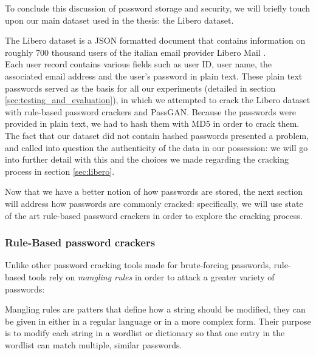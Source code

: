 To conclude this discussion of password storage and security, we will briefly touch upon our main dataset used in the thesis: the Libero dataset.

The Libero dataset is a JSON formatted document that contains information on roughly 700 thousand users of the italian email provider Libero Mail \cite{libero_leak}.\\
Each user record contains various fields such as  user ID, user name, the associated email address and the user's password in plain text.
These plain text passwords served as the basis for all our experiments (detailed in section \ref{sec:testing_and_evaluation}), in which we attempted to crack the Libero dataset with rule-based password crackers and PassGAN. Because the passwords were provided in plain text, we had to hash them with MD5 in order to crack them.
The fact that our dataset did not contain hashed passwords presented a problem, and called into question the authenticity of the data in our possession: we will go into further detail with this  and the choices we made regarding the cracking process in section \ref{sec:libero}.  

Now that we have a better notion of how passwords are stored, the next section will address how passwords are commonly cracked: specifically, we will use state of the art rule-based password crackers in order to explore the cracking process. %


\subsubsection{Rule-Based password crackers} \label{hash_and_jtr}
Unlike other password cracking tools made for brute-forcing passwords, rule-based tools rely on \emph{mangling rules} in order to attack a greater variety of passwords:

Mangling rules are patters that define how a string should be modified, they can be given in either in a regular language or in a more complex form.
Their purpose is to modify each string in a wordlist or dictionary so that one entry in the wordlist can match multiple, similar passwords.

